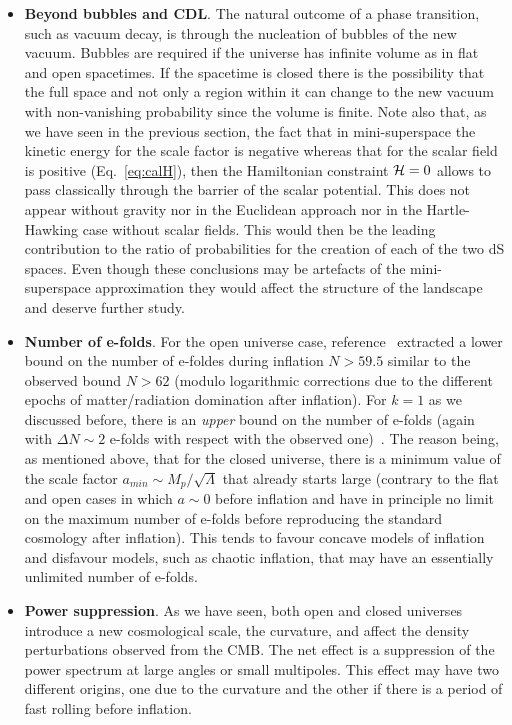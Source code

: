 \documentclass[a4paper,11pt]{article}
\numberwithin{equation}{section}
\begin{document}
\begin{itemize}
\item{\bf Beyond bubbles and CDL}. The natural outcome of a phase transition, such as vacuum decay, is through the nucleation of bubbles of the new vacuum. Bubbles are required if the universe has infinite volume as in flat and open spacetimes. If the spacetime is closed there is the possibility that the full space and not only a region within it  can change to the new vacuum with non-vanishing probability since the volume is finite.  Note also that, as we have seen in the previous section, the fact that in mini-superspace the kinetic energy for the scale factor is negative whereas that for the scalar field is positive (Eq.~\eqref{eq:calH}), then the Hamiltonian constraint ${\cal H}=0$ allows to pass classically through the barrier of the scalar potential. This does not appear without gravity nor in the Euclidean approach nor in the Hartle-Hawking case without scalar fields. This would then be the leading contribution to the ratio of probabilities for the creation of each of the two dS spaces. Even though these conclusions may be artefacts of the mini-superspace approximation they would affect the structure of the landscape and deserve further study.

\item{\bf Number of e-folds}. For the open universe case,  reference~\cite{Freivogel:2005vv}  extracted a lower bound on the number of e-foldes during inflation $N>59.5$ similar to the observed bound $N>62$ (modulo logarithmic corrections due to the different epochs of matter/radiation domination after inflation). For $k=1$ as we discussed before, there is an {\it upper} bound on the number of e-folds (again with $\Delta N\sim 2$ e-folds with respect with the observed one)~\cite{Uzan:2003nk}. The reason being, as mentioned above, that for the closed universe, there is a minimum value of the scale factor $a_{min}\sim M_p/\sqrt{\Lambda}$ that already starts large (contrary to the flat and open cases in which $a\sim 0$ before inflation and have in principle no limit on the maximum number of e-folds before reproducing the standard cosmology after inflation). This tends to favour concave models of inflation and disfavour models, such as chaotic inflation, that may have an essentially unlimited number of e-folds.

 
\item{\bf Power suppression}. As we have seen, both open and closed universes introduce a new cosmological scale, the curvature, and affect the density perturbations observed from the CMB. The net effect is  a suppression of the power  spectrum at large angles or small multipoles. This effect may have two different origins, one due to the curvature and the other if there is a period of fast rolling before inflation.



\end{itemize}
\end{document}

